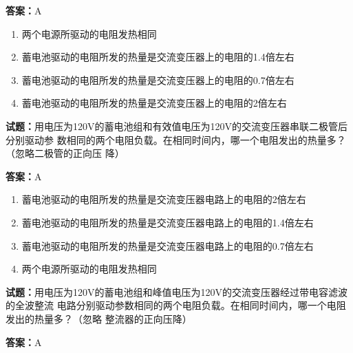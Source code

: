 \documentclass{ctexbook}
\begin{document}
\textbf{答案：}A 

\begin{enumerate}[leftmargin=3em]
  \item 两个电源所驱动的电阻发热相同 

  \item 蓄电池驱动的电阻所发的热量是交流变压器上的电阻的1.4倍左右 

  \item 蓄电池驱动的电阻所发的热量是交流变压器上的电阻的0.7倍左右 

  \item 蓄电池驱动的电阻所发的热量是交流变压器上的电阻的2倍左右 


\end{enumerate}





\vspace{1em}

\textbf{试题：}用电压为120V的蓄电池组和有效值电压为120V的交流变压器串联二极管后分别驱动参
数相同的两个电阻负载。在相同时间内，哪一个电阻发出的热量多？（忽略二极管的正向压
降） 

\textbf{答案：}A 

\begin{enumerate}[leftmargin=3em]
  \item 蓄电池驱动的电阻所发的热量是交流变压器电路上的电阻的2倍左右 

  \item 蓄电池驱动的电阻所发的热量是交流变压器电路上的电阻的1.4倍左右 

  \item 蓄电池驱动的电阻所发的热量是交流变压器电路上的电阻的0.7倍左右 

  \item 两个电源所驱动的电阻发热相同 

\end{enumerate}





\vspace{1em}

\textbf{试题：}用电压为120V的蓄电池组和峰值电压为120V的交流变压器经过带电容滤波的全波整流
电路分别驱动参数相同的两个电阻负载。在相同时间内，哪一个电阻发出的热量多？（忽略
整流器的正向压降） 

\textbf{答案：}A 
\end{document}
